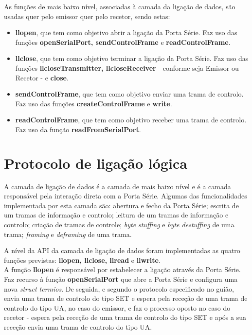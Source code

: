 \documentclass[a4paper, 11pt]{article}
\begin{document}
As funções de mais baixo nível, associadas à camada da ligação de dados, são usadas quer pelo emissor quer pelo recetor, sendo estas:
\begin{itemize}
	\item \textbf{llopen}, que tem como objetivo abrir a ligação da Porta Série. Faz uso das funções \textbf{openSerialPort, sendControlFrame} e \textbf{readControlFrame}.
	\item \textbf{llclose}, que tem como objetivo terminar a ligação da Porta Série. Faz uso das funções \textbf{llcloseTransmitter, llcloseReceiver} - conforme seja Emissor ou Recetor - e \textbf{close}.
	\item \textbf{sendControlFrame}, que tem como objetivo enviar uma trama de controlo. Faz uso das funções \textbf{createControlFrame} e \textbf{write}.
	\item \textbf{readControlFrame}, que tem como objetivo receber uma trama de controlo. Faz uso da função \textbf{readFromSerialPort}.
\end{itemize}

\section{Protocolo de ligação lógica}

 A camada de ligação de dados é a camada de mais baixo nível e é a camada responsável pela interação direta com a Porta Série. Algumas das funcionalidades implementada por esta camada são: abertura e fecho da Porta Série; escrita de um tramas de informação e controlo; leitura de um tramas de informação e controlo; criação de tramas de controle; \textit{byte stuffing} e \textit{byte destuffing} de uma trama; \textit{framing } e \textit{deframing} de uma trama.

A nível da API da camada de ligação de dados foram implementadas as quatro funções previstas: \textbf{llopen, llclose, llread} e \textbf{llwrite}.\\

A função \textbf{llopen} é responsável por estabelecer a ligação através da Porta Série. Faz recurso à função \textbf{openSerialPort} que abre a Porta Série e configura uma nova \textit{struct termios}. De seguida, e segundo o protocolo especificado no guião, envia uma trama de controlo do tipo SET e espera pela receção de uma trama de controlo do tipo UA, no caso do emissor, e faz o processo oposto no caso do recetor - espera pela receção de uma trama de controlo do tipo SET e após a sua receção envia uma trama de controlo do tipo UA.
\end{document}
